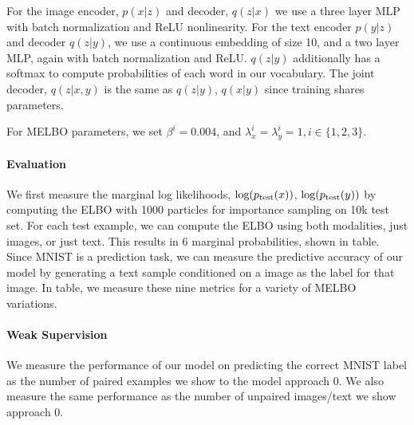 \documentclass{article}
\begin{document}
For the image encoder, $p(x|z)$ and decoder, $q(z|x)$ we use a three layer MLP with batch normalization and ReLU nonlinearity. For the text encoder $p(y|z)$ and decoder $q(z|y)$, we use a continuous embedding of size 10, and a two layer MLP, again with batch normalization and ReLU. $q(z|y)$ additionally has a softmax to compute probabilities of each word in our vocabulary. The joint decoder, $q(z|x,y)$ is the same as $q(z|y)$, $q(x|y)$ since training shares parameters.

For MELBO parameters, we set $\beta^{i} = 0.004$, and $\lambda_{x}^{i} = \lambda_{y}^{i} = 1, i \in \{1,2,3\}$.

\paragraph{Evaluation} We first measure the marginal log likelihoods, $\textup{log}(p_{\textup{test}}(x))$, $\textup{log}(p_{\textup{test}}(y))$ by computing the ELBO with 1000 particles for importance sampling on 10k test set. For each test example, we can compute the ELBO using both modalities, just images, or just text. This results in 6 marginal probabilities, shown in table. Since MNIST is a prediction task, we can measure the predictive accuracy of our model by generating a text sample conditioned on a image as the label for that image. In table, we measure these nine metrics for a variety of MELBO variations. 

\paragraph{Weak Supervision} We measure the performance of our model on predicting the correct MNIST label as the number of paired examples we show to the model approach 0. We also measure the same performance as the number of unpaired images/text we show approach 0. 
\end{document}

